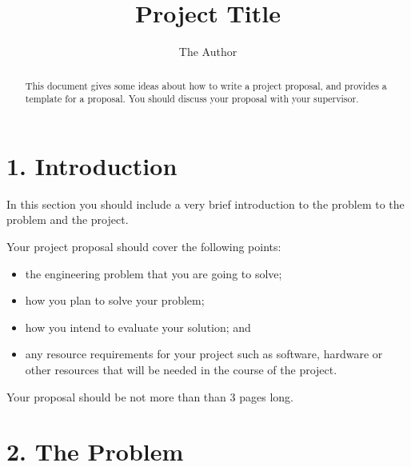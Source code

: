 \documentclass[11pt, a4paper, twoside, openright]{report}
\title{Project Title}
\author{The Author}
\date{}
\begin{document}
\frontmatter


\begin{abstract}
  This document gives some ideas about how to write a project
  proposal, and provides a template for a proposal. You should discuss
  your proposal with your supervisor.
\end{abstract}


\maketitle




\mainmatter


\section*{1. Introduction}

In this section you should include a very brief introduction to the
problem to the problem and the project.

Your project proposal should cover the following points:

\begin{itemize}
\item the engineering problem that you are going to solve;
\item how you plan to solve your problem;
\item how you intend to evaluate your solution; and
\item any resource requirements for your project such as software,
  hardware or other resources that will be needed in the course of the
  project.
\end{itemize}

Your proposal should be not more than than 3 pages long.

\section*{2. The Problem}
\end{document}
